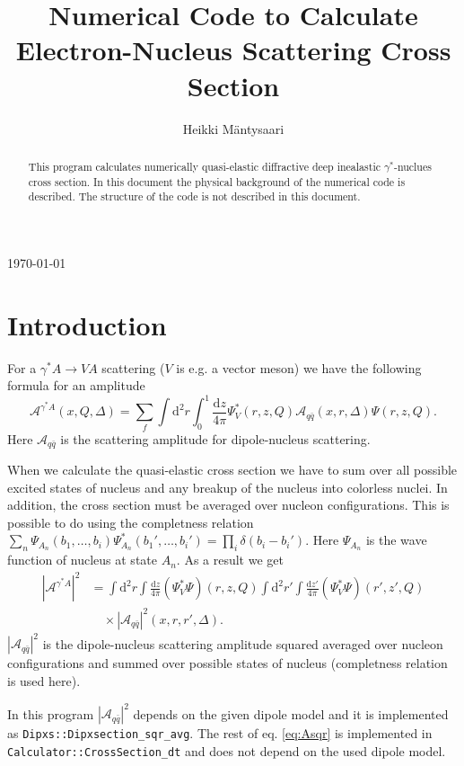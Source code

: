 \documentclass[a4paper,12pt]{article}
\title{Numerical Code to Calculate Electron-Nucleus Scattering Cross Section}
\author{Heikki Mäntysaari}
\date{}
\newcommand{\code}[1]{\texttt{#1}}
\newcommand{\der}{\mathrm{d}}
\newcommand{\A}{\mathcal{A}}
\begin{document}
 
\maketitle
\begin{center}\today\end{center}
\begin{abstract}
This program calculates numerically quasi-elastic diffractive deep inealastic $\gamma^*$-nuclues cross section. In this document the physical background of the numerical code is described. The structure of the code is not described in this document.
\end{abstract}


\section{Introduction}
For a $\gamma^*A \rightarrow VA$ scattering ($V$ is e.g. a vector meson) we have the following formula for an amplitude \cite{Caldwell:2009ke}
\begin{equation}
	\A^{\gamma^* A}(x,Q,\Delta) =	\sum_f \int \der^2 r \int_0^1 \frac{\der z}{4\pi} \Psi_V^*(r,z,Q) \A_{q\bar q}(x,r,\Delta) \Psi(r,z,Q).
\end{equation}
Here $\A_{q\bar q}$ is the scattering amplitude for dipole-nucleus scattering. 

When we calculate the quasi-elastic cross section we have to sum over all possible excited states of nucleus and any breakup of the nucleus into colorless nuclei. In addition, the cross section must be averaged over nucleon configurations. This is possible to do using the completness relation $\sum_n \Psi_{A_n}(b_1,\dots,b_i) \Psi_{A_n}^*(b_1',\dots,b_i') = \prod_i \delta(b_i-b_i')$. Here $\Psi_{A_n}$ is the wave function of nucleus at state $A_n$. As a result we get
\begin{equation}
\begin{split}
	\label{eq:Asqr}
	|\A^{\gamma^* A}|^2 &= \int \der^2 r \int \frac{\der z}{4\pi} (\Psi_V^*\Psi)(r,z,Q) \int \der^2 r' \int \frac{\der z'}{4\pi} (\Psi_V^*\Psi)(r',z',Q) \\
	&\quad  \times |\A_{q\bar q}|^2(x,r,r',\Delta).
\end{split}
\end{equation}
$|\A_{q\bar q}|^2$ is the dipole-nucleus scattering amplitude squared averaged over nucleon configurations and summed over possible states of nucleus (completness relation is used here).

In this program $|\A_{q\bar q}|^2$ depends on the given dipole model and it is implemented as \code{Dipxs::Dipxsection\_sqr\_avg}. The rest of eq. \eqref{eq:Asqr} is implemented in \code{Calculator::CrossSection\_dt} and does not depend on the used dipole model.
\end{document}
